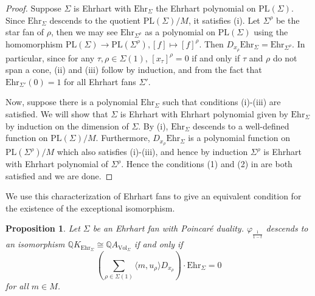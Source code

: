 \documentclass[oneside]{amsart}
\theoremstyle{plain}
\newtheorem{proposition}[theorem]{Proposition}
\theoremstyle{definition}
\newcommand{\Q}{{\mathbb{Q}}}
\newcommand{\Vol}{{\mathrm{Vol}}}
\newcommand{\Ehr}{{\mathrm{Ehr}}}
\newcommand{\PL}{{\mathrm{PL}}}
\begin{document}
\begin{proof}
Suppose $\Sigma$ is Ehrhart with $\Ehr_\Sigma$ the Ehrhart polynomial on $\PL(\Sigma)$. Since $\Ehr_\Sigma$ descends to the quotient $\PL(\Sigma)/M$, it satisfies (i). Let $\Sigma^\rho$ be the star fan of $\rho$, then we may see $\Ehr_{\Sigma^\rho}$ as a polynomial on $\PL(\Sigma)$ using the homomorphism $\PL(\Sigma) \to \PL(\Sigma^\rho), [f] \mapsto [f]^\rho$. Then $D_{x_\rho} \Ehr_{\Sigma} = \Ehr_{\Sigma^\rho}$.
In particular, since for any $\tau, \rho \in \Sigma(1)$, 
$[x_\tau]^\rho = 0$ if and only if $\tau$ and $\rho$ do not span a cone, (ii) and (iii) follow by induction, and from the fact that $\Ehr_{\Sigma'}(0) = 1$ for all Ehrhart fans $\Sigma'$.

Now, suppose there is a polynomial $\Ehr_\Sigma$ such that conditions (i)-(iii) are satisfied. We will show that $\Sigma$ is Ehrhart with Ehrhart polynomial given by $\Ehr_\Sigma$ by induction on the dimension of $\Sigma$. By (i), $\Ehr_\Sigma$ descends to a well-defined function on $\PL(\Sigma)/M$. Furthermore, $D_{x_\rho} \Ehr_\Sigma$ is a polynomial function on $\PL(\Sigma^\rho)/M$ which also satisfies (i)-(iii), and hence by induction $\Sigma^\rho$ is Ehrhart with Ehrhart polynomial of $\Sigma^\rho$. Hence the conditions (1) and (2) in \cite[Definition 3.3]{EhrhartFans} are both satisfied and we are done.
\end{proof}

We use this characterization of Ehrhart fans to give an equivalent condition for the existence of the exceptional isomorphism.

\begin{proposition}
\label{prop:condition on exceptional iso for Ehrhart fans}
Let $\Sigma$ be an Ehrhart fan with Poincar\'e duality. $\varphi_{\frac{1}{1 - t}}$ descends to an isomorphism $\Q K_{\Ehr_\Sigma}\cong \Q A_{\Vol_\Sigma}$ if and only if
 \[
    \left(\sum_{\rho\in\Sigma(1)} \langle m,u_\rho\rangle D_{x_\rho}\right) \cdot \Ehr_\Sigma=0
 \]
 for all $m\in M$. 
\end{proposition}
\end{document}
